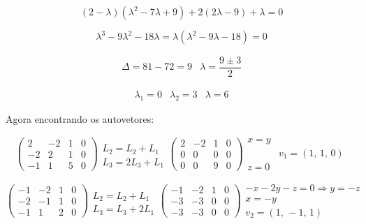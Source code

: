 \begin{enumerate}
	$$(2 - \lambda)(\lambda^2 - 7\lambda+9)+2(2\lambda-9)+\lambda = 0$$
	
	$$\lambda^3 - 9\lambda^2 - 18\lambda = \lambda(\lambda^2 -9\lambda-18) = 0$$
		
	$$
	\begin{array}{cc}
		\Delta = 81 - 72 = 9 & \lambda = \dfrac{9 \pm 3}{2}
	\end{array}	
	$$

	$$
	\begin{array}{ccc}
		\lambda_1 = 0 & \lambda_2 = 3 & \lambda = 6
	\end{array}
	$$
	
	Agora encontrando os autovetores:
	
	$$
	\begin{pmatrix}
		2 &  -2 & 1 & 0\\
		-2 & 2 & 1 & 0\\
		-1 &  1 & 5 & 0
	\end{pmatrix}	
	\begin{array}{c}
		\\ L_2 = L_2 + L_1 \\ L_3 = 2L_3 + L_1
	\end{array}
	\begin{pmatrix}
		2 &  -2 & 1 & 0\\
		0 & 0 & 0 & 0\\
		0 & 0 & 9 & 0
	\end{pmatrix}
	\begin{array}{cc}
		x = y\\ & v_1 = (1, \, 1, \, 0) \\ z = 0
	\end{array}
	$$
	
	$$
	\begin{pmatrix}
		-1 &  -2 & 1 & 0\\
		-2 & -1 & 1 & 0\\
		-1 &  1 & 2 & 0
	\end{pmatrix}	
	\begin{array}{c}
		\\ L_2 = L_2 + L_1 \\ L_3 = L_3 + 2L_1
	\end{array}
	\begin{pmatrix}
		-1 & -2 & 1 & 0\\
		-3 & -3 & 0 & 0\\
		-3 & -3 & 0 & 0
	\end{pmatrix}
	\begin{array}{c}
		-x-2y-z=0 \Rightarrow y = -z \\ x = -y \\ v_2 = (1, \, -1, \, 1)
	\end{array}
	$$


\end{enumerate}
